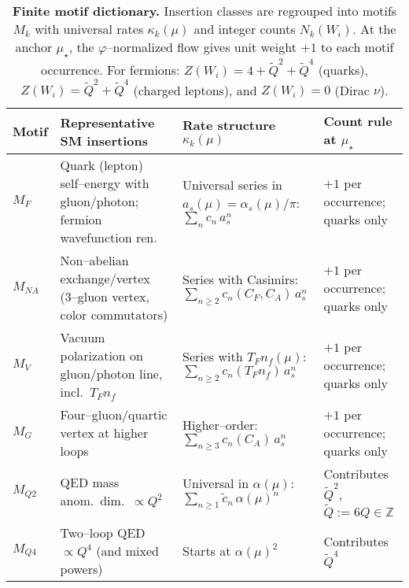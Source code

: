 \documentclass[epjc3]{svjour3}
\begin{document}
\begin{table}[h]
  \centering
  \small
  \begin{tabular}{@{}l p{} p{} p{}@{}}
    \toprule
    \textbf{Motif} & \textbf{Representative SM insertions} & \textbf{Rate structure $\kappa_k(\mu)$} & \textbf{Count rule at $\mu_\star$} \\
    \midrule
    $M_F$ &
      Quark (lepton) self--energy with gluon/photon; fermion wavefunction ren. &
      Universal series in $a_s(\mu)=\alpha_s(\mu)/\pi$: $\sum_n c_n\,a_s^n$ &
      $+1$ per occurrence; quarks only \\
    \addlinespace[0.3em]
    $M_{NA}$ &
      Non--abelian exchange/vertex (3--gluon vertex, color commutators) &
      Series with Casimirs: $\sum_{n\ge2} c_n(C_F,C_A)\,a_s^n$ &
      $+1$ per occurrence; quarks only \\
    \addlinespace[0.3em]
    $M_V$ &
      Vacuum polarization on gluon/photon line, incl.\ $T_F n_f$ &
      Series with $T_F n_f(\mu)$: $\sum_{n\ge2} c_n(T_F n_f)\,a_s^n$ &
      $+1$ per occurrence; quarks only \\
    \addlinespace[0.3em]
    $M_G$ &
      Four--gluon/quartic vertex at higher loops &
      Higher--order: $\sum_{n\ge3} c_n(C_A)\,a_s^n$ &
      $+1$ per occurrence; quarks only \\
    \addlinespace[0.4em]
    $M_{Q2}$ &
      QED mass anom.\ dim.\ $\propto Q^2$ &
      Universal in $\alpha(\mu)$: $\sum_{n\ge1} \tilde c_n\,\alpha(\mu)^n$ &
      Contributes $\tilde Q^2$, $\tilde Q:=6Q\in\mathbb{Z}$ \\
    \addlinespace[0.3em]
    $M_{Q4}$ &
      Two--loop QED $\propto Q^4$ (and mixed powers) &
      Starts at $\alpha(\mu)^2$ &
      Contributes $\tilde Q^4$ \\
    \bottomrule
  \end{tabular}
  \caption{\textbf{Finite motif dictionary.} Insertion classes are regrouped into motifs $M_k$ with universal rates $\kappa_k(\mu)$ and integer counts $N_k(W_i)$. At the anchor $\mu_\star$, the $\varphi$--normalized flow gives unit weight $+1$ to each motif occurrence. For fermions: $Z(W_i)=4+\tilde Q^2+\tilde Q^4$ (quarks), $Z(W_i)=\tilde Q^2+\tilde Q^4$ (charged leptons), and $Z(W_i)=0$ (Dirac $\nu$).}
  \label{tab:motif-dictionary}
\end{table}
\end{document}
